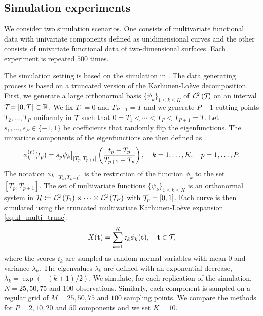 \subsection{Simulation experiments} %
\label{sub:simulation_experiments}

We consider two simulation scenarios. One consists of multivariate functional data with univariate components defined as unidimensional curves and the other consists of univariate functional data of two-dimensional surfaces. Each experiment is repeated $500$ times.

\begin{scenario}
The simulation setting is based on the simulation in \cite{happMultivariateFunctionalPrincipal2018a}. The data generating process is based on a truncated version of the Karhunen-Loève decomposition. First, we generate a large orthonormal basis $\{\psi_k\}_{1 \leq k \leq K}$ of $\mathcal{L}^{2}\left(\mathcal{T}_{}\right)$ on an interval $\mathcal{T}_{} = [0, T] \subset \mathbb{R}$. We fix $T_1 = 0$ and $T_{P + 1} = T$ and we generate $P - 1$ cutting points $T_2, \dots, T_P$ uniformly in $\mathcal{T}_{}$ such that $0 = T_1 < \cdots < T_P < T_{P+1} = T$. Let $s_1, \dots, s_P \in \{-1, 1\}$ be coefficients that randomly flip the eigenfunctions. The univariate components of the eigenfunctions are then defined as
\begin{equation}\label{eq:simulation_uni_component}
    \phi_k^{(p)}(t_p) = s_p \restr{\psi_k}{[T_p, T_{p + 1}]}\left(\frac{t_p - T_p}{T_{p + 1} - T_p}\right), \quad k = 1, \dots, K, \quad p = 1, \dots, P.
\end{equation}
The notation $\restr{\phi_k}{[T_p, T_{p + 1}]}$ is the restriction of the function $\phi_k$ to the set $[T_p, T_{p + 1}]$. The set of multivariate functions $\{\psi_k\}_{1 \leq k \leq K}$ is an orthonormal system in $\mathcal{H} \coloneqq \mathcal{L}^{2}\left(\mathcal{T}_{1}\right) \times \dots \times \mathcal{L}^{2}\left(\mathcal{T}_{P}\right)$ with $\mathcal{T}_{p} = [0, 1]$. Each curve is then simulated using the truncated multivariate Karhunen-Loève expansion \eqref{eq:kl_multi_trunc}:
\begin{equation}
    X(\mathbf{t}) = \sum_{k = 1}^K \mathfrak{c}_k \phi_k(\mathbf{t}), \quad \mathbf{t} \in \mathcal{T}_{},
\end{equation}
where the scores $\mathfrak{c}_k$ are sampled as random normal variables with mean $0$ and variance $\lambda_k$. The eigenvalues $\lambda_k$ are defined with an exponential decrease, $\lambda_k = \exp(-(k + 1)/2)$. We simulate, for each replication of the simulation, $N = 25, 50, 75$ and $100$ observations. Similarly, each component is sampled on a regular grid of $M = 25, 50, 75$ and $100$ sampling points. We compare the methods for $P = 2, 10, 20$ and $50$ components and we set $K = 10$.
\end{scenario}

